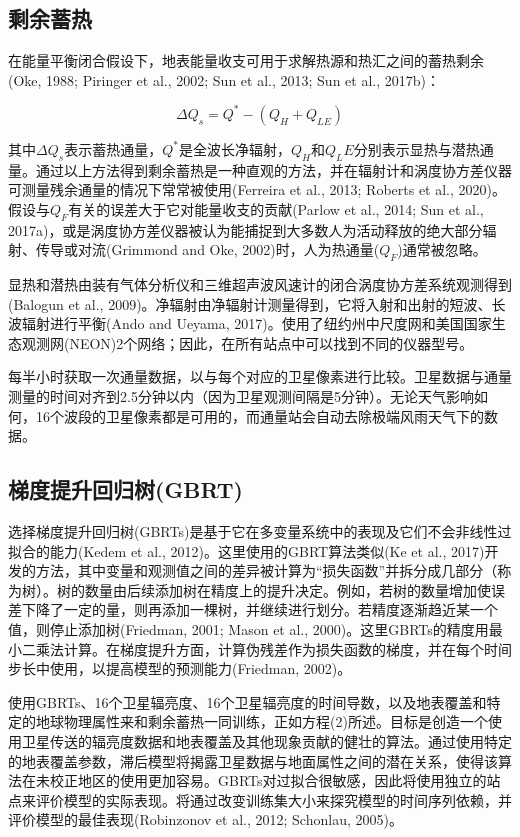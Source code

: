 \documentclass[3p,times]{elsarticle}
\begin{document}
\subsection{剩余蓄热}

在能量平衡闭合假设下，地表能量收支可用于求解热源和热汇之间的蓄热剩余(Oke, 1988; Piringer et al., 2002; Sun et al., 2013; Sun et al., 2017b)：

\begin{equation}
    \Delta Q_s=Q^*-(Q_H+Q_{LE})
\end{equation}

其中$\Delta Q_s$表示蓄热通量，$Q^*$是全波长净辐射，$Q_H$和$Q_LE$分别表示显热与潜热通量。通过以上方法得到剩余蓄热是一种直观的方法，并在辐射计和涡度协方差仪器可测量残余通量的情况下常常被使用(Ferreira et al., 2013; Roberts et al., 2020)。假设与$Q_F$有关的误差大于它对能量收支的贡献(Parlow et al., 2014; Sun et al., 2017a)，或是涡度协方差仪器被认为能捕捉到大多数人为活动释放的绝大部分辐射、传导或对流(Grimmond and Oke, 2002)时，人为热通量($Q_F$)通常被忽略。

显热和潜热由装有气体分析仪和三维超声波风速计的闭合涡度协方差系统观测得到(Balogun et al., 2009)。净辐射由净辐射计测量得到，它将入射和出射的短波、长波辐射进行平衡(Ando and Ueyama, 2017)。使用了纽约州中尺度网和美国国家生态观测网(NEON)2个网络；因此，在所有站点中可以找到不同的仪器型号。

每半小时获取一次通量数据，以与每个对应的卫星像素进行比较。卫星数据与通量测量的时间对齐到2.5分钟以内（因为卫星观测间隔是5分钟）。无论天气影响如何，16个波段的卫星像素都是可用的，而通量站会自动去除极端风雨天气下的数据。

\subsection{梯度提升回归树(GBRT)}

选择梯度提升回归树(GBRTs)是基于它在多变量系统中的表现及它们不会非线性过拟合的能力(Kedem et al., 2012)。这里使用的GBRT算法类似(Ke et al., 2017)开发的方法，其中变量和观测值之间的差异被计算为“损失函数”并拆分成几部分（称为树）。树的数量由后续添加树在精度上的提升决定。例如，若树的数量增加使误差下降了一定的量，则再添加一棵树，并继续进行划分。若精度逐渐趋近某一个值，则停止添加树(Friedman, 2001; Mason et al., 2000)。这里GBRTs的精度用最小二乘法计算。在梯度提升方面，计算伪残差作为损失函数的梯度，并在每个时间步长中使用，以提高模型的预测能力(Friedman, 2002)。

使用GBRTs、16个卫星辐亮度、16个卫星辐亮度的时间导数，以及地表覆盖和特定的地球物理属性来和剩余蓄热一同训练，正如方程(2)所述。目标是创造一个使用卫星传送的辐亮度数据和地表覆盖及其他现象贡献的健壮的算法。通过使用特定的地表覆盖参数，滞后模型将揭露卫星数据与地面属性之间的潜在关系，使得该算法在未校正地区的使用更加容易。GBRTs对过拟合很敏感，因此将使用独立的站点来评价模型的实际表现。将通过改变训练集大小来探究模型的时间序列依赖，并评价模型的最佳表现(Robinzonov et al., 2012; Schonlau, 2005)。
\end{document}
